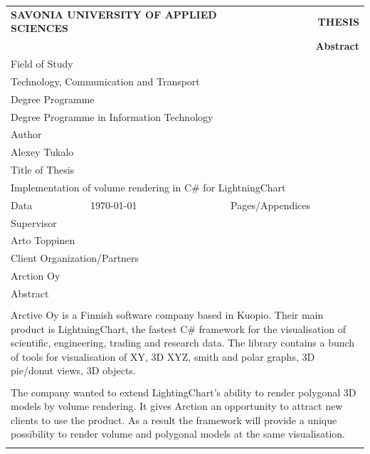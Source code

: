 \documentclass[twoside, english, 11pt]{report}
\begin{document}
\begin{table}[!h]
\begin{tabular}{| l | l | l | l |}
\multicolumn{2}{l}{\textbf{SAVONIA UNIVERSITY OF APPLIED SCIENCES}}&
\multicolumn{2}{r}{\textbf{THESIS}}\\
\multicolumn{4}{r}{\textbf{Abstract}}\\
\hline
\multicolumn{4}{|l|}{Field of Study}\\
\multicolumn{4}{|l|}{Technology, Communication and Transport}\\
\hline
\multicolumn{4}{|l|}{Degree Programme}\\
\multicolumn{4}{|l|}{Degree Programme in Information Technology}\\
\hline
\multicolumn{4}{|l|}{Author}\\
\multicolumn{4}{|l|}{Alexey Tukalo}\\
\hline
\multicolumn{4}{|l|}{Title of Thesis}\\
\multicolumn{4}{|l|}{Implementation of volume rendering in C\# for LightningChart}\\
\hline
Data & \today & Pages/Appendices & \pageref{LastPage}\\
\hline
\multicolumn{4}{|l|}{Supervisor}\\
\multicolumn{4}{|l|}{Arto Toppinen}\\
\hline
\multicolumn{4}{|l|}{Client Organization/Partners}\\
\multicolumn{4}{|l|}{Arction Oy}\\
\hline
\multicolumn{4}{|l|}{Abstract}\\
\multicolumn{4}{|l|}{ }\\
\multicolumn{4}{|p{14cm}|}{
Arctive Oy is a Finnish software company based in Kuopio. Their main product is LightningChart, the fastest C\# framework for the visualisation of scientific, engineering, trading and research data. The library contains a bunch of tools for visualisation of XY, 3D XYZ, smith and polar graphs, 3D pie/donut views, 3D objects.
}\\
\multicolumn{4}{|l|}{ }\\
\multicolumn{4}{|p{14cm}|}{
The company wanted to extend LightingChart's ability to render polygonal 3D models by volume rendering. It gives Arction an opportunity to attract new clients to use the product. As a result the framework will provide a unique possibility to render volume and polygonal models at the same visualisation.
}\\
\multicolumn{4}{|l|}{ }\\

\end{tabular}
\end{table}
\end{document}
